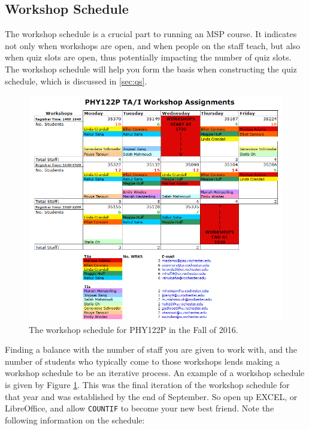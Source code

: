 \documentclass[12pt]{article}
\begin{document}
\subsection{Workshop Schedule} \label{sec:schedule}

The workshop schedule is a crucial part to running an MSP course. It indicates not only when workshops are open, and when people on the staff teach, but also when quiz slots are open, thus potentially impacting the number of quiz slots. The workshop schedule will help you form the basis when constructing the quiz schedule, which is discussed in \ref{sec:qs}.

\begin{figure}[h]
  \centering
      \includegraphics[width=.8\textwidth]{Figures/ExampleWorkshopSchedule.png}
  \caption{\protect\label{fig:egws} The workshop schedule for PHY122P in the Fall of 2016.}
\end{figure}

\indent Finding a balance with the number of staff you are given to work with, and the number of students who typically come to those workshops lends making a workshop schedule to be an iterative process. An example of a workshop schedule is given by Figure \ref{fig:egws}. This was the final iteration of the workshop schedule for that year and was established by the end of September. So open up EXCEL, or LibreOffice, and allow \texttt{COUNTIF} to become your new best friend. Note the following information on the schedule:
\end{document}

